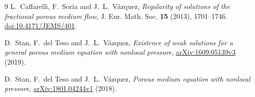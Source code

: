 \documentclass[11pt]{article}
\theoremstyle{definition}
\begin{document}
\begin{thebibliography}{9}
L.~Caffarelli, F.~Soria and J.~L.~V\'azquez,
\emph{Regularity of solutions of the fractional porous medium flow},
J. Eur. Math. Soc. \textbf{15} (2013), 1701--1746.
\href{https://doi.org/10.4171/JEMS/401}{doi:10.4171/JEMS/401}.

D.~Stan, F.~del Teso and J.~L.~V\'azquez,
\emph{Existence of weak solutions for a general porous medium equation with nonlocal pressure},
\href{https://arxiv.org/abs/1609.05139v3}{arXiv:1609.05139v3} (2019).

D.~Stan, F.~del Teso and J.~L.~V\'azquez,
\emph{Porous medium equation with nonlocal pressure},
\href{https://arxiv.org/abs/1801.04244v1}{arXiv:1801.04244v1} (2018).
\end{thebibliography}
\end{document}
